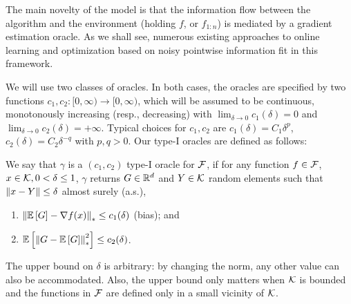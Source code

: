 The main novelty of the model is that the information flow between the algorithm and the environment (holding $f$, or $f_{1:n}$) is mediated by a gradient estimation oracle. As we shall see, numerous existing approaches to online learning and optimization based on noisy pointwise information fit in this framework.

We will use two classes of oracles. In both cases, the oracles are specified by
two functions $c_1,c_2:[0,\infty)\to [0,\infty)$, which will be assumed to be continuous,
monotonously increasing (resp., decreasing) with
$\lim_{\delta\to  0} c_1(\delta)=0$ and $\lim_{\delta\to 0} c_2(\delta)=+\infty$.
Typical choices for $c_1,c_2$ are $c_1(\delta) = C_1 \delta^p$, $c_2(\delta) = C_2\delta^{-q}$ with $p,q>0$.
Our type-I oracles are defined as follows:
\vspace{-0.2cm}
\begin{definition}
\label{def:oracle1}
We say that $\gamma$ is a  $(c_1,c_2)$ type-I oracle for $\mathcal{F}$, if for any function $f\in \mathcal{F}$,
$x\in \mathcal{K},0<\delta\le 1$, $\gamma$ returns $G\in \mathbb{R}^d$ and  $Y\in \mathcal{K}$ random elements such that
$\left\|x-Y\right\|\le \delta$ almost surely (a.s.),
\vspace{-0.2cm}
\begin{enumerate}
\item $\left\| \mathbb{E}\left[G\right]  - \nabla f(x)  \right\|_* \le c_1(\delta) $ (bias); and
\item $\mathbb{E}\left[\left\| G -  \mathbb{E}\left[G\right] \right\|_*^2\right] \le c_2(\delta)$.
\end{enumerate}
\vspace{-0.1cm}
\end{definition}
The upper bound on $\delta$ is arbitrary: by changing the norm, any other value can also be accommodated. Also, the upper bound only matters when $\mathcal{K}$ is bounded and the functions in $\mathcal{F}$ are defined only in a small vicinity of $\mathcal{K}$.

